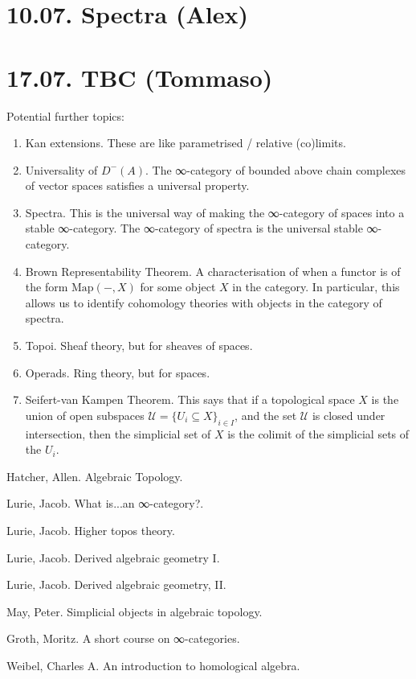 \documentclass[a4paper]{amsart}
\numberwithin{figure}{section}
\theoremstyle{theorem}
\theoremstyle{definition}
\begin{document}

\section{10.07. Spectra (Alex)}



\section{17.07. TBC (Tommaso)}

Potential further topics:

\begin{enumerate}
 \item Kan extensions. These are like parametrised / relative (co)limits.
 \item Universality of $D^-(A)$. The ∞-category of bounded above chain complexes of vector spaces satisfies a universal property.
 \item Spectra. This is the universal way of making the ∞-category of spaces into a stable ∞-category. The ∞-category of spectra is the universal stable ∞-category. 
 \item Brown Representability Theorem. A characterisation of when a functor is of the form $\mathrm{Map}(-, X)$ for some object $X$ in the category. In particular, this allows us to identify cohomology theories with objects in the category of spectra.
 \item Topoi. Sheaf theory, but for sheaves of spaces.
 \item Operads. Ring theory, but for spaces. 
 \item Seifert-van Kampen Theorem. This says that if a topological space $X$ is the union of open subspaces $\mathscr{U} = \{U_i \subseteq X\}_{i \in I}$, and the set $\mathscr{U}$ is closed under intersection, then the simplicial set of $X$ is the colimit of the simplicial sets of the $U_i$. 
\end{enumerate}



\begin{thebibliography}{99.}

Hatcher, Allen.
\newblock Algebraic Topology.

Lurie, Jacob.
\newblock What is...an ∞-category?.

Lurie, Jacob.
\newblock Higher topos theory.

Lurie, Jacob.
\newblock Derived algebraic geometry I.

Lurie, Jacob.
\newblock Derived algebraic geometry, II.

May, Peter.
\newblock Simplicial objects in algebraic topology.

Groth, Moritz.
\newblock A short course on ∞-categories.

Weibel, Charles  A.
\newblock An introduction to homological algebra.
\end{thebibliography}
\end{document}
